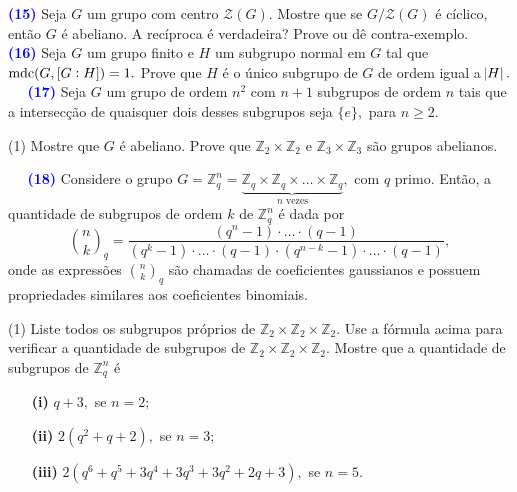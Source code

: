 \documentclass[12pt, a4paper]{article}
\newcommand{\mdc}{{\rm mdc}}
\newcommand{\negrito}[1]{\mbox{\boldmath{$#1$}}}
\begin{document}
\textcolor{blue}{\bf(15)}\label{53} Seja $G$ um grupo com centro $\mathcal{Z}(G).$ Mostre que se $G/\mathcal{Z}(G)$ é cíclico, então $G$ é abeliano. A recíproca é verdadeira? Prove ou dê contra-exemplo.
\textcolor{white}{Oi}\newline\newline
\textcolor{blue}{\bf(16)}\label{54} Seja $G$ um grupo finito e $H$ um subgrupo normal em $G$ tal que $\mdc(G, [G:H]) = 1.$ Prove que $H$ é o único subgrupo de $G$ de ordem igual a $\abs{H}.$ 
\textcolor{white}{Oi}\newline\newline
\textcolor{blue}{\bf(17)}\label{55} Seja $G$ um grupo de ordem $n^2$ com $n+1$ subgrupos de ordem $n$ tais que a intersecção de quaisquer dois desses subgrupos seja $\{e \},$ para $n \ge 2.$ 
\begin{tasks}[counter-format={(tsk[a])},label-width=3.6ex, label-format = {\bfseries}, column-sep = {0pt}](1)
\task[\textcolor{Floresta}{$\negrito{(a)} $}] Mostre que $G$ é abeliano.
\task[\textcolor{Floresta}{$\negrito{(b)} $}] Prove que $\mathbb{Z}_2 \times \mathbb{Z}_2$ e $\mathbb{Z}_3 \times \mathbb{Z}_3$ são grupos abelianos.
\end{tasks}
\textcolor{white}{Oi}\newline\newline
\textcolor{blue}{\bf(18)}\label{56} Considere o grupo $G = \mathbb{Z}_q^n = \underbrace{\mathbb{Z}_q \times \mathbb{Z}_q \times \ldots \times \mathbb{Z}_q}_{n \mbox{ vezes}},$ com $q$ primo. Então, a quantidade de subgrupos de ordem $k$ de $\mathbb{Z}_q^n$ é dada por
\[
\binom{n}{k}_q = \frac{(q^n - 1) \cdot \ldots \cdot (q - 1)}{(q^k - 1) \cdot \ldots \cdot (q - 1) \cdot (q^{n-k}-1) \cdot \ldots \cdot (q - 1)},
\]
onde as expressões $\binom{n}{k}_q$ são chamadas de coeficientes gaussianos e possuem propriedades similares aos coeficientes binomiais. 
\begin{tasks}[counter-format={(tsk[a])},label-width=3.6ex, label-format = {\bfseries}, column-sep = {0pt}](1)
\task[\textcolor{Floresta}{$\negrito{(a)} $}] Liste todos os subgrupos próprios de $\mathbb{Z}_2 \times \mathbb{Z}_2 \times \mathbb{Z}_2.$
\task[\textcolor{Floresta}{$\negrito{(b)} $}] Use a fórmula acima para verificar a quantidade de subgrupos de $\mathbb{Z}_2 \times \mathbb{Z}_2 \times \mathbb{Z}_2.$
\task[\textcolor{Floresta}{$\negrito{(c)} $}] Mostre que a quantidade de subgrupos de $\mathbb{Z}_q^n$ é
\begin{itemize}
    \item[\textbf{(i)}] $q+3,$ se $n =2;$%
    \item[\textbf{(ii)}] $2(q^2+q+2),$ se $n =3;$%
    \item[\textbf{(iii)}] $2(q^6+q^5+3q^4+3q^3+3q^2 +2q+3),$ se $n =5.$%
\end{itemize}
\end{tasks}
\newpage
\end{document}
